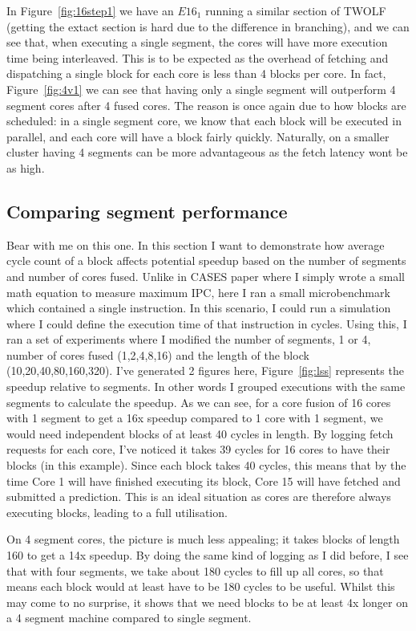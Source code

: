 In Figure~\ref{fig:16step1} we have an $E16_1$ running a similar section of TWOLF (getting the extact section is hard due to the difference in branching), and we can see that, when executing a single segment, the cores will have more execution time being interleaved. This is to be expected as the overhead of fetching and dispatching a single block for each core is less than 4 blocks per core.
In fact, Figure~\ref{fig:4v1} we can see that having only a single segment will outperform 4 segment cores after 4 fused cores.
The reason is once again due to how blocks are scheduled: in a single segment core, we know that each block will be executed in parallel, and each core will have a block fairly quickly.
Naturally, on a smaller cluster having 4 segments can be more advantageous as the fetch latency wont be as high.

\newpage
\subsection{Comparing segment performance}

Bear with me on this one.
In this section I want to demonstrate how average cycle count of a block affects potential speedup based on the number of segments and number of cores fused.
Unlike in CASES paper where I simply wrote a small math equation to measure maximum IPC, here I ran a small microbenchmark which contained a single instruction.
In this scenario, I could run a simulation where I could define the execution time of that instruction in cycles.
Using this, I ran a set of experiments where I modified the number of segments, 1 or 4, number of cores fused (1,2,4,8,16) and the length of the block (10,20,40,80,160,320).
I've generated 2 figures here, Figure~\ref{fig:lss} represents the speedup relative to segments.
In other words I grouped executions with the same segments to calculate the speedup.
As we can see, for a core fusion of 16 cores with 1 segment to get a 16x speedup compared to 1 core with 1 segment, we would need independent blocks of at least 40 cycles in length.
By logging fetch requests for each core, I've noticed it takes 39 cycles for 16 cores to have their blocks (in this example).
Since each block takes 40 cycles, this means that by the time Core 1 will have finished executing its block, Core 15 will have fetched and submitted a prediction.
This is an ideal situation as cores are therefore always executing blocks, leading to a full utilisation.

On 4 segment cores, the picture is much less appealing; it takes blocks of length 160 to get a 14x speedup.
By doing the same kind of logging as I did before, I see that with four segments, we take about 180 cycles to fill up all cores, so that means each block would at least have to be 180 cycles to be useful. 
Whilst this may come to no surprise, it shows that we need blocks to be at least 4x longer on a 4 segment machine compared to single segment.

